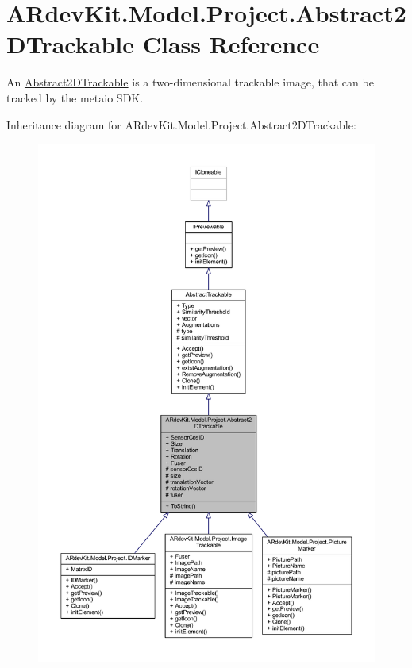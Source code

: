 \hypertarget{class_a_rdev_kit_1_1_model_1_1_project_1_1_abstract2_d_trackable}{\section{A\-Rdev\-Kit.\-Model.\-Project.\-Abstract2\-D\-Trackable Class Reference}
\label{class_a_rdev_kit_1_1_model_1_1_project_1_1_abstract2_d_trackable}
}


An \hyperlink{class_a_rdev_kit_1_1_model_1_1_project_1_1_abstract2_d_trackable}{Abstract2\-D\-Trackable} is a two-\/dimensional trackable image, that can be tracked by the metaio S\-D\-K.  




Inheritance diagram for A\-Rdev\-Kit.\-Model.\-Project.\-Abstract2\-D\-Trackable\-:
\nopagebreak
\begin{figure}[H]
\begin{center}
\leavevmode
\includegraphics[width=350pt]{class_a_rdev_kit_1_1_model_1_1_project_1_1_abstract2_d_trackable__inherit__graph}
\end{center}
\end{figure}


